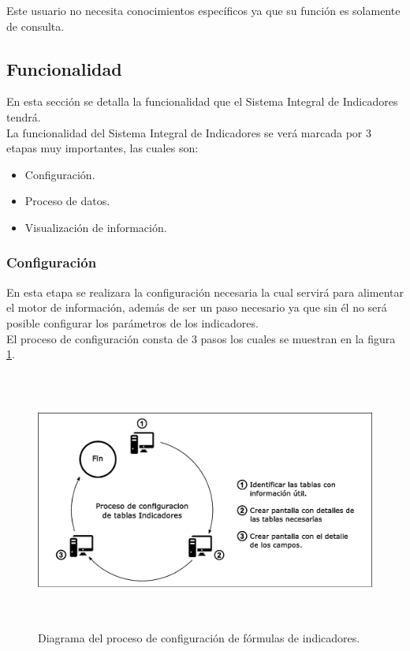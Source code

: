 				Este usuario no necesita conocimientos espec\'ificos ya que su funci\'on es solamente de consulta.

		\subsection{Funcionalidad}

			En esta secci\'on se detalla la funcionalidad que el Sistema Integral de Indicadores tendr\'a.\\

			La funcionalidad del Sistema Integral de Indicadores se ver\'a marcada por 3 etapas muy importantes, las cuales son:
			\begin{itemize}
				\item Configuraci\'on.
				\item Proceso de datos.
				\item Visualizaci\'on de informaci\'on.
			\end{itemize}

			\subsubsection{Configuraci\'on}

				En esta etapa se realizara la configuraci\'on necesaria la cual servir\'a para alimentar el motor de informaci\'on, adem\'as de ser un paso necesario ya que sin \'el no ser\'a posible configurar los par\'ametros de los indicadores.\\

				El proceso de configuraci\'on consta de 3 pasos los cuales se muestran en la figura \ref{fig_ConfiguracionIndicadores}.\\

				\begin{figure}[H]
			        \centering
			        \includegraphics[width=16cm, height=8.5cm]{figuras/ConfiguracionIndicadores}
			        \caption{Diagrama del proceso de configuraci\'on de f\'ormulas de indicadores.}
			        \label{fig_ConfiguracionIndicadores}
			    \end{figure}


